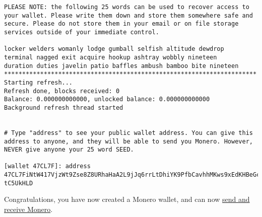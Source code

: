 \begin{lstlisting}[mathescape]
PLEASE NOTE: the following 25 words can be used to recover access to your wallet. Please write them down and store them somewhere safe and secure. Please do not store them in your email or on file storage services outside of your immediate control.

locker welders womanly lodge gumball selfish altitude dewdrop
terminal nagged exit acquire hookup ashtray wobbly nineteen
duration duties javelin patio baffles ambush bamboo bite nineteen
**********************************************************************
Starting refresh...
Refresh done, blocks received: 0
Balance: 0.000000000000, unlocked balance: 0.000000000000
Background refresh thread started


# Type "address" to see your public wallet address. You can give this address to anyone, and they will be able to send you Monero. However, NEVER give anyone your 25 word SEED.

[wallet 47CL7F]: address
47CL7FiNtW417VjzWt9Zse8Z8URhaHaA2L9jJq6rrLtDhiYK9PfbCavhhMKws9xEdKHBeGcQtJmPt4uEMivooNz tC5UkHLD
\end{lstlisting}
Congratulations, you have now created a Monero wallet, and can now \href{https://www.monero.how/tutorial-how-to-send-and-receive-monero-command-line}{send and receive Monero}.
